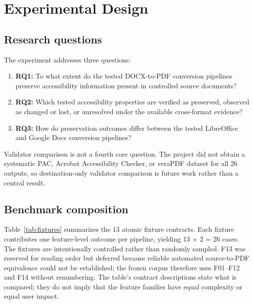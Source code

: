 \section{Experimental Design}
\label{sec:experiment}

\subsection{Research questions}

The experiment addresses three questions:

\begin{enumerate}
\item \textbf{RQ1:} To what extent do the tested DOCX-to-PDF conversion pipelines preserve accessibility information present in controlled source documents?
\item \textbf{RQ2:} Which tested accessibility properties are verified as preserved, observed as changed or lost, or unresolved under the available cross-format evidence?
\item \textbf{RQ3:} How do preservation outcomes differ between the tested LibreOffice and Google Docs conversion pipelines?
\end{enumerate}

Validator comparison is not a fourth core question. The project did not obtain a systematic PAC, Acrobat Accessibility Checker, or veraPDF dataset for all 26 outputs, so destination-only validator comparison is future work rather than a central result.

\subsection{Benchmark composition}

Table~\ref{tab:fixtures} summarizes the 13 atomic fixture contracts. Each fixture contributes one feature-level outcome per pipeline, yielding 13 $\times$ 2 = 26 cases. The fixtures are intentionally controlled rather than randomly sampled. F13 was reserved for reading order but deferred because reliable automated source-to-PDF equivalence could not be established; the frozen corpus therefore uses F01--F12 and F14 without renumbering. The table's contract descriptions state what is compared; they do not imply that the feature families have equal complexity or equal user impact.


